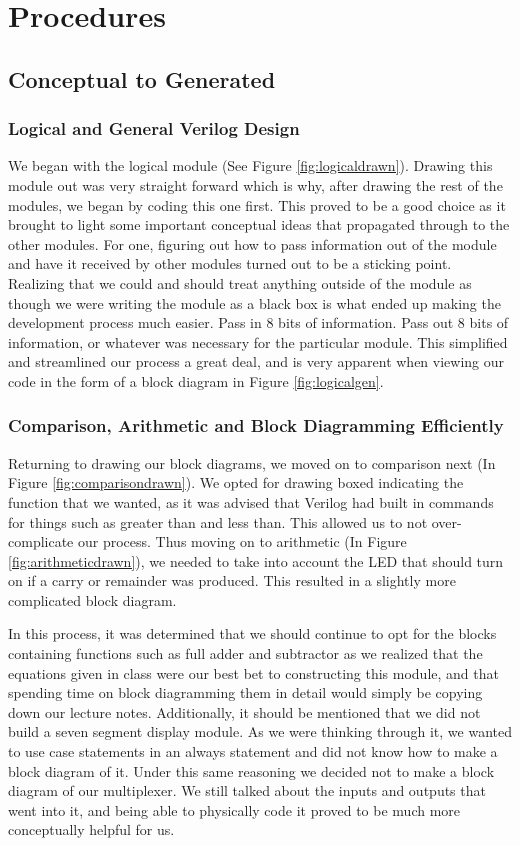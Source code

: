 \documentclass[11pt]{article}
\begin{document}
\section{Procedures}
\subsection{Conceptual to Generated}
\subsubsection{Logical and General Verilog Design}
We began with the logical module (See Figure \ref{fig:logicaldrawn}). Drawing this module out was very straight forward which is why, after drawing the rest of the modules, we began by coding this one first. This proved to be a good choice as it brought to light some important conceptual ideas that propagated through to the other modules. For one, figuring out how to pass information out of the module and have it received by other modules turned out to be a sticking point. Realizing that we could and should treat anything outside of the module as though we were writing the module as a black box is what ended up making the development process much easier. Pass in 8 bits of information. Pass out 8 bits of information, or whatever was necessary for the particular module. This simplified and streamlined our process a great deal, and is very apparent when viewing our code in the form of a block diagram in Figure \ref{fig:logicalgen}.

\subsubsection{Comparison, Arithmetic and Block Diagramming Efficiently}
Returning to drawing our block diagrams, we moved on to comparison next (In Figure \ref{fig:comparisondrawn}). We opted for drawing boxed indicating the function that we wanted, as it was advised that Verilog had built in commands for things such as greater than and less than. This allowed us to not over-complicate our process. Thus moving on to arithmetic (In Figure \ref{fig:arithmeticdrawn}), we needed to take into account the LED that should turn on if a carry or remainder was produced. This resulted in a slightly more complicated block diagram.

In this process, it was determined that we should continue to opt for the blocks containing functions such as full adder and subtractor as we realized that the equations given in class were our best bet to constructing this module, and that spending time on block diagramming them in detail would simply be copying down our lecture notes. Additionally, it should be mentioned that we did not build a seven segment display module. As we were thinking through it, we wanted to use case statements in an always statement and did not know how to make a block diagram of it. Under this same reasoning we decided not to make a block diagram of our multiplexer. We still talked about the inputs and outputs that went into it, and being able to physically code it proved to be much more conceptually helpful for us.
\end{document}

